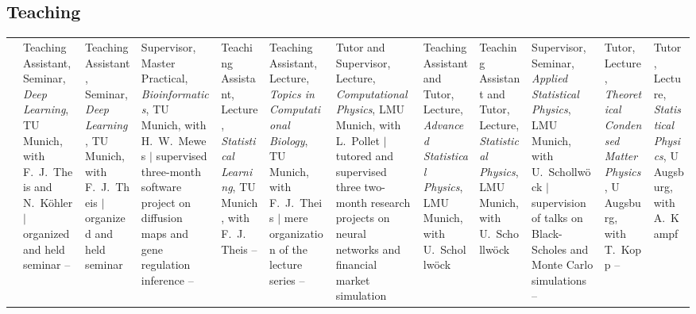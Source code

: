 \subsection*{Teaching }\vspace{-1em}
\begin{longtable}[t]{R{\widthC} p{\widthB}}
& Teaching Assistant, Seminar, \emph{Deep Learning}, TU Munich, with F.~J.~Theis and N.~Köhler {\footnotesize$\vert$ organized and held  seminar}
\newline
{} -- 
& Teaching Assistant, Seminar, \emph{Deep Learning}, TU Munich, with F.~J.~Theis {\footnotesize$\vert$  organized and held seminar}
\newline
{}
& Supervisor, Master Practical, \emph{Bioinformatics}, TU Munich, with H.~W.~Mewes {\footnotesize$\vert$ supervised three-month software project on diffusion maps and gene regulation inference}
\newline
{} -- 
& Teaching Assistant, Lecture, \emph{Statistical Learning}, TU Munich, with F.~J.~Theis
\newline
{} -- 
& Teaching Assistant, Lecture, \emph{Topics in Computational Biology}, TU Munich, with F.~J.~Theis {\footnotesize$\vert$ mere organization of the lecture series}
\newline
{} -- 
& Tutor and Supervisor, Lecture, \emph{Computational Physics}, LMU Munich, with  L.~Pollet 
{\footnotesize$\vert$ tutored and supervised three two-month research projects on neural networks and financial market simulation} \newline
{}
& Teaching Assistant and Tutor, Lecture, \emph{Advanced Statistical Physics}, LMU Munich, with U.~Schollwöck \newline
{}
& Teaching Assistant and Tutor, Lecture, \emph{Statistical Physics}, LMU Munich, with U.~Schollwöck\newline
{}
& Supervisor, Seminar, \emph{Applied Statistical Physics}, LMU Munich, with U.~Schollwöck {\footnotesize$\vert$ supervision of talks on Black-Scholes and Monte Carlo simulations}\newline
{} -- 
& Tutor, Lecture, \emph{Theoretical Condensed Matter Physics}, U Augsburg, with T.~Kopp\newline
{} -- 
& Tutor, Lecture, \emph{Statistical Physics}, U Augsburg, with A.~Kampf
\end{longtable}


